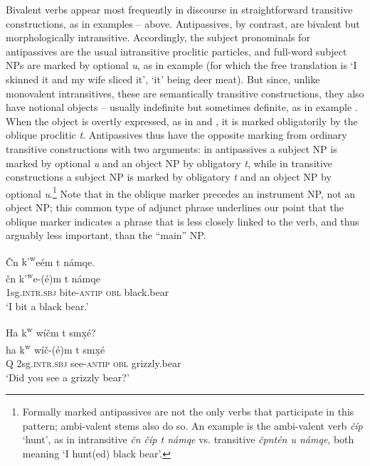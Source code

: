 \documentclass[output=paper,colorlinks,citecolor=brown]{langscibook}
\begin{document}
Bivalent verbs appear most frequently in discourse in straightforward
transitive constructions, as in examples -- above.  Antipassives, by
contrast, are bivalent but morphologically intransitive.  Accordingly,
the subject pronominals for antipassives are the usual intransitive
proclitic particles, and full-word subject NPs are marked by optional
\emph{{\textltilde}u}, as in example  (for which the free translation is
`I skinned it and my wife sliced it', `it' being deer meat).  But
since, unlike monovalent intransitives, these are semantically
transitive constructions, they also have notional objects -- usually
indefinite but sometimes definite, as in example .  When the object is
overtly expressed, as in  and , it is marked obligatorily by the
oblique proclitic \emph{t}.  Antipassives thus have the opposite
marking from ordinary transitive constructions with two arguments: in
antipassives a subject NP is marked by optional \emph{{\textltilde}u}
and an object NP by obligatory \emph{t}, while in transitive
constructions a subject NP is marked by obligatory \emph{t} and an
object NP by optional \emph{{\textltilde}u}.\footnote{Formally marked
antipassives are not the only verbs that participate in this pattern;
ambi-valent stems also do so.  An example is the ambi-valent verb \emph{\v{c}{\textltilde}\'ip} `hunt', as in intransitive \emph{\v{c}n
 \v{c}{\textltilde}\'ip t n{\textltilde}\'amqe} vs. transitive \emph{\v{c}{\textltilde}pnt\'en {\textltilde}u n{\textltilde}\'amqe}, both
meaning `I hunt(ed) black bear'.} Note that in  the oblique marker
precedes an instrument NP, not an object NP; this common type of
adjunct phrase underlines our point that the oblique marker indicates
a phrase that is less closely linked to the verb, and thus arguably
less important, than the ``main'' NP.

\ea 
\label{ex-thomason-14}
\v{C}n {k'\textsuperscript w}e\textglotstop\'em t n\textltilde\'amqe. \\
\gll \v{c}n {k'\textsuperscript w}e{\textglotstop}-(\'e)m t
n\textltilde\'amqe\\
1sg.\textsc{intr.sbj} bite-\textsc{antip} \textsc{obl}  black.bear \\
\glt `I bit a  black bear.'
\z

\ea 
\label{ex-thomason-15}
Ha {k\textsuperscript w} w\'i\v{c}m t sm\d{x}\'e? \\
\gll ha k\textsuperscript w w\'i\v{c}-(\'e)m t sm\d{x}\'e\\ 
Q 2sg.\textsc{intr.sbj} see-\textsc{antip} \textsc{obl} grizzly.bear\\
\glt `Did you see a grizzly bear?'
\z 
\end{document}
